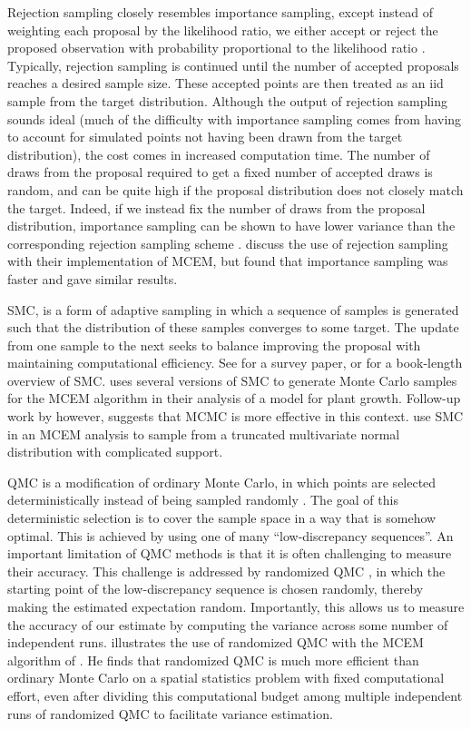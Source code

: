 \documentclass[11pt, oneside]{article}   	%
\begin{document}
Rejection sampling closely resembles importance sampling, except instead of weighting each proposal by the likelihood ratio, we either accept or reject the proposed observation with probability proportional to the likelihood ratio \citep{Rob04}. Typically, rejection sampling is continued until the number of accepted proposals reaches a desired sample size. These accepted points are then treated as an iid sample from the target distribution. Although the output of rejection sampling sounds ideal (much of the difficulty with importance sampling comes from having to account for simulated points not having been drawn from the target distribution), the cost comes in increased computation time. The number of draws from the proposal required to get a fixed number of accepted draws is random, and can be quite high if the proposal distribution does not closely match the target. Indeed, if we instead fix the number of draws from the proposal distribution, importance sampling can be shown to have lower variance than the corresponding rejection sampling scheme \citep[see Section 8.8 of][]{Cho20}. \citet{Boo99} discuss the use of rejection sampling with their implementation of MCEM, but found that importance sampling was faster and gave similar results.

SMC, is a form of adaptive sampling in which a sequence of samples is generated such that the distribution of these samples converges to some target. The update from one sample to the next seeks to balance improving the proposal with maintaining computational efficiency. See \citet{Del06} for a survey paper, or \citet{Cho20} for a book-length overview of SMC. \citet{Tre13} uses several versions of SMC to generate Monte Carlo samples for the MCEM algorithm in their analysis of a model for plant growth. Follow-up work by \citet{Tre14} however, suggests that MCMC is more effective in this context. \citet{Mof14} use SMC in an MCEM analysis to sample from a truncated multivariate normal distribution with complicated support.

QMC is a modification of ordinary Monte Carlo, in which points are selected deterministically instead of being sampled randomly \citep{Cal98}. The goal of this deterministic selection is to cover the sample space in a way that is somehow optimal. This is achieved by using one of many ``low-discrepancy sequences''. An important limitation of QMC methods is that it is often challenging to measure their accuracy. This challenge is addressed by randomized QMC \citep{LEc02}, in which the starting point of the low-discrepancy sequence is chosen randomly, thereby making the estimated expectation random. Importantly, this allows us to measure the accuracy of our estimate by computing the variance across some number of independent runs. \citet{Jan05} illustrates the use of randomized QMC with the MCEM algorithm of \citet{Boo99}. He finds that randomized QMC is much more efficient than ordinary Monte Carlo on a spatial statistics problem with fixed computational effort, even after dividing this computational budget among multiple independent runs of randomized QMC to facilitate variance estimation.
\end{document}

